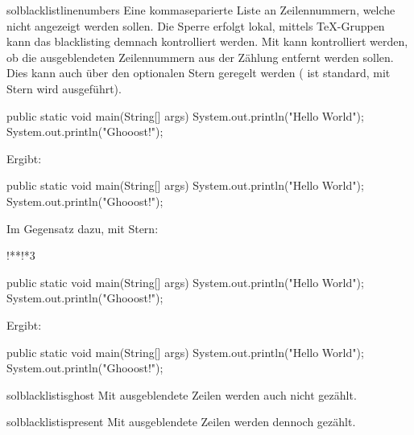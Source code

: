 \documentclass{sopra-base}
\begin{document}
\begin{command}{solblacklistlinenumbers}{\optStar{}}
    Eine kommaseparierte Liste an Zeilennummern, welche nicht angezeigt werden sollen. Die Sperre erfolgt lokal, mittels \TeX-Gruppen kann das blacklisting demnach kontrolliert werden.
    Mit   kann kontrolliert werden, ob die ausgeblendeten Zeilennummern aus der Zählung entfernt werden sollen.
    Dies kann auch über den optionalen Stern geregelt werden ( ist standard, mit Stern wird  ausgeführt).
\begin{latex}[morekeywords={[5]{\\solblacklistlinenumbers}}]
\begin{java}
public static void main(String[] args){
    System.out.println("Hello World");
    System.out.println("Ghooost!");
}
\end{java}
\end{latex}
Ergibt: {
\begin{java}
public static void main(String[] args){
    System.out.println("Hello World");
    System.out.println("Ghooost!");
}
\end{java}
}
Im Gegensatz dazu, mit Stern:
\begin{latex}[morekeywords={[5]{\\solblacklistlinenumbers}}]
\solblacklistlinenumbers!**!*{3}
\begin{java}
public static void main(String[] args){
    System.out.println("Hello World");
    System.out.println("Ghooost!");
}
\end{java}
\end{latex}
Ergibt: {
\begin{java}
public static void main(String[] args){
    System.out.println("Hello World");
    System.out.println("Ghooost!");
}
\end{java}
}
\end{command}

\begin{command}{solblacklistisghost}{}
    Mit  ausgeblendete Zeilen werden auch nicht gezählt.
\end{command}

\begin{command}{solblacklistispresent}{}
    Mit  ausgeblendete Zeilen werden dennoch gezählt.
\end{command}
\end{document}

